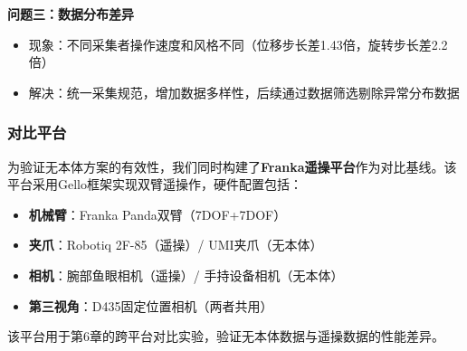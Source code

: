 \textbf{问题三：数据分布差异}
\begin{itemize}[leftmargin=2em]
    \item 现象：不同采集者操作速度和风格不同（位移步长差1.43倍，旋转步长差2.2倍）
    \item 解决：统一采集规范，增加数据多样性，后续通过数据筛选剔除异常分布数据
\end{itemize}

\subsubsection{对比平台}

为验证无本体方案的有效性，我们同时构建了\textbf{Franka遥操平台}作为对比基线。该平台采用Gello框架实现双臂遥操作，硬件配置包括：

\begin{itemize}[leftmargin=2em]
    \item \textbf{机械臂}：Franka Panda双臂（7DOF+7DOF）
    \item \textbf{夹爪}：Robotiq 2F-85（遥操）/ UMI夹爪（无本体）
    \item \textbf{相机}：腕部鱼眼相机（遥操）/ 手持设备相机（无本体）
    \item \textbf{第三视角}：D435固定位置相机（两者共用）
\end{itemize}

该平台用于第6章的跨平台对比实验，验证无本体数据与遥操数据的性能差异。

